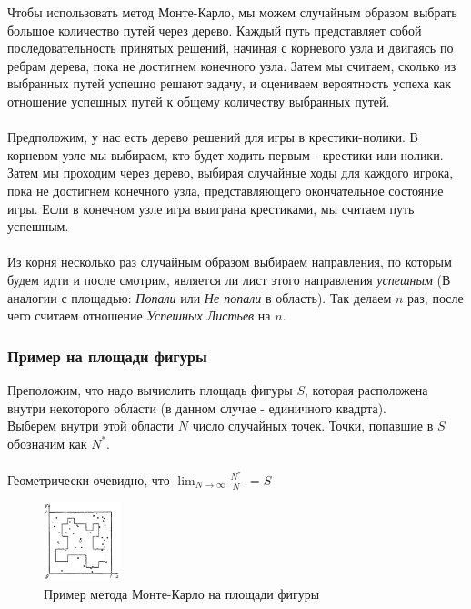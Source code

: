             Чтобы использовать метод Монте-Карло, мы можем случайным образом выбрать большое количество путей через дерево. Каждый путь представляет собой последовательность принятых решений, начиная с корневого узла и двигаясь по ребрам дерева, пока не достигнем конечного узла. Затем мы считаем, сколько из выбранных путей успешно решают задачу, и оцениваем вероятность успеха как отношение успешных путей к общему количеству выбранных путей.
            \\

            \\
            Предположим, у нас есть дерево решений для игры в крестики-нолики. В корневом узле мы выбираем, кто будет ходить первым - крестики или нолики. Затем мы проходим через дерево, выбирая случайные ходы для каждого игрока, пока не достигнем конечного узла, представляющего окончательное состояние игры. Если в конечном узле игра выиграна крестиками, мы считаем путь успешным.\\

            \\
            Из корня несколько раз случайным образом выбираем направления, по которым будем идти и после смотрим, является ли лист этого направления \textit{успешным} (В аналогии с площадью: \textit{Попали} или \textit{Не попали} в область). Так делаем $n$ раз, после чего считаем отношение \textit{Успешных Листьев} на $n$.
            
        
        \subsubsection{Пример на площади фигуры}

            Преположим, что надо вычислить площадь фигуры $S$, которая расположена внутри некоторого области (в данном случае - единичного квадрта).\\
            Выберем внутри этой области $N$ число случайных точек. Точки, попавшие в $S$ обозначим как $N^*$.\\\\
            Геометрически очевидно, что $\lim_{N \to \infty} \frac{N^*}{N}$ $= S$
            \begin{figure}[H]
                \centering
                \includegraphics[width=0.2\textwidth]{images/chapter1/monte-carlo-area.png}
                \caption{Пример метода Монте-Карло на площади фигуры}
                \label{fig:images/chapter1/monte-carlo-area.png}
            \end{figure}
        
